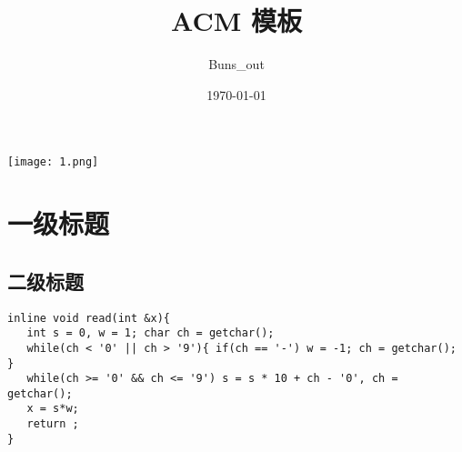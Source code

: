 \documentclass[12pt, a4paper, oneside]{ctexart}
\title{\fontsize{70}{30}\selectfont  ACM 模板}
\author{Buns\_out}
\date{\today}
\begin{document}
 

\maketitle
\thispagestyle{empty}
\centering
\texttt{[image: 1.png]}

\newpage
\tableofcontents 
\thispagestyle{empty}
\lstset{language=C++}

\newpage 
\section{一级标题} 
\subsection{二级标题} 
\begin{lstlisting}
inline void read(int &x){
   int s = 0, w = 1; char ch = getchar();
   while(ch < '0' || ch > '9'){ if(ch == '-') w = -1; ch = getchar(); }
   while(ch >= '0' && ch <= '9') s = s * 10 + ch - '0', ch = getchar();
   x = s*w;
   return ;
}
\end{lstlisting}
\end{document}
